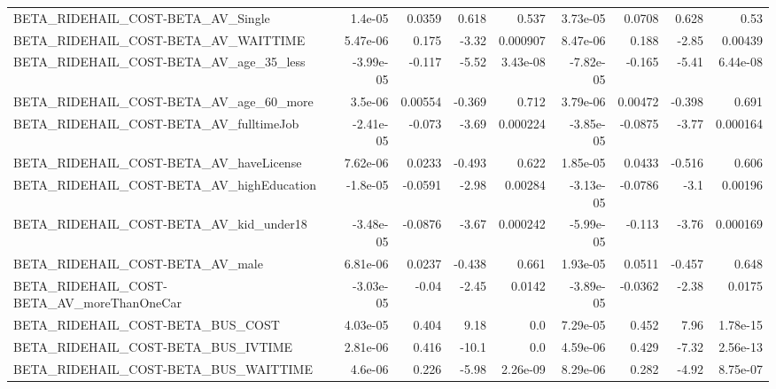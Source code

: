 \begin{tabular}{lrrrrrrrr}
BETA\_RIDEHAIL\_COST-BETA\_AV\_Single                  &     1.4e-05 &       0.0359 &     0.618 &    0.537 &   3.73e-05 &      0.0708 &        0.628 &          0.53 \\
BETA\_RIDEHAIL\_COST-BETA\_AV\_WAITTIME                &    5.47e-06 &        0.175 &     -3.32 & 0.000907 &   8.47e-06 &       0.188 &        -2.85 &       0.00439 \\
BETA\_RIDEHAIL\_COST-BETA\_AV\_age\_35\_less             &   -3.99e-05 &       -0.117 &     -5.52 & 3.43e-08 &  -7.82e-05 &      -0.165 &        -5.41 &      6.44e-08 \\
BETA\_RIDEHAIL\_COST-BETA\_AV\_age\_60\_more             &     3.5e-06 &      0.00554 &    -0.369 &    0.712 &   3.79e-06 &     0.00472 &       -0.398 &         0.691 \\
BETA\_RIDEHAIL\_COST-BETA\_AV\_fulltimeJob             &   -2.41e-05 &       -0.073 &     -3.69 & 0.000224 &  -3.85e-05 &     -0.0875 &        -3.77 &      0.000164 \\
BETA\_RIDEHAIL\_COST-BETA\_AV\_haveLicense             &    7.62e-06 &       0.0233 &    -0.493 &    0.622 &   1.85e-05 &      0.0433 &       -0.516 &         0.606 \\
BETA\_RIDEHAIL\_COST-BETA\_AV\_highEducation           &    -1.8e-05 &      -0.0591 &     -2.98 &  0.00284 &  -3.13e-05 &     -0.0786 &         -3.1 &       0.00196 \\
BETA\_RIDEHAIL\_COST-BETA\_AV\_kid\_under18             &   -3.48e-05 &      -0.0876 &     -3.67 & 0.000242 &  -5.99e-05 &      -0.113 &        -3.76 &      0.000169 \\
BETA\_RIDEHAIL\_COST-BETA\_AV\_male                    &    6.81e-06 &       0.0237 &    -0.438 &    0.661 &   1.93e-05 &      0.0511 &       -0.457 &         0.648 \\
BETA\_RIDEHAIL\_COST-BETA\_AV\_moreThanOneCar          &   -3.03e-05 &        -0.04 &     -2.45 &   0.0142 &  -3.89e-05 &     -0.0362 &        -2.38 &        0.0175 \\
BETA\_RIDEHAIL\_COST-BETA\_BUS\_COST                   &    4.03e-05 &        0.404 &      9.18 &      0.0 &   7.29e-05 &       0.452 &         7.96 &      1.78e-15 \\
BETA\_RIDEHAIL\_COST-BETA\_BUS\_IVTIME                 &    2.81e-06 &        0.416 &     -10.1 &      0.0 &   4.59e-06 &       0.429 &        -7.32 &      2.56e-13 \\
BETA\_RIDEHAIL\_COST-BETA\_BUS\_WAITTIME               &     4.6e-06 &        0.226 &     -5.98 & 2.26e-09 &   8.29e-06 &       0.282 &        -4.92 &      8.75e-07 \\

\end{tabular}
